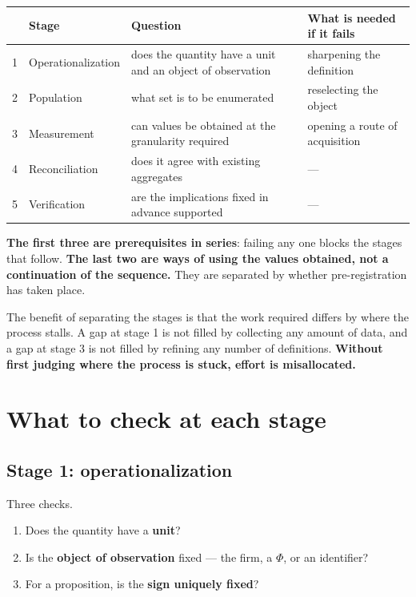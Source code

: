 \begin{center}
\begin{tabularx}{\textwidth}{@{}llXl@{}}
\toprule
 & Stage & Question & What is needed if it fails \\
\midrule
1 & Operationalization & does the quantity have a unit and an object of observation & sharpening the definition \\
2 & Population & what set is to be enumerated & reselecting the object \\
3 & Measurement & can values be obtained at the granularity required & opening a route of acquisition \\
\midrule
4 & Reconciliation & does it agree with existing aggregates & --- \\
5 & Verification & are the implications fixed in advance supported & --- \\
\bottomrule
\end{tabularx}
\label{tab:five-stages}
\end{center}

\textbf{The first three are prerequisites in series}: failing any one blocks the stages that
follow. \textbf{The last two are ways of using the values obtained, not a continuation of the
sequence.} They are separated by whether pre-registration has taken place.

The benefit of separating the stages is that the work required differs by where the process
stalls. A gap at stage 1 is not filled by collecting any amount of data, and a gap at stage 3
is not filled by refining any number of definitions.
\textbf{Without first judging where the process is stuck, effort is misallocated.}

\section{What to check at each stage}

\subsection{Stage 1: operationalization}

Three checks.

\begin{enumerate}[label=(\arabic*)]
\item Does the quantity have a \textbf{unit}?
\item Is the \textbf{object of observation} fixed --- the firm, a $\Phi$, or an identifier?
\item For a proposition, is the \textbf{sign uniquely fixed}?
\end{enumerate}

